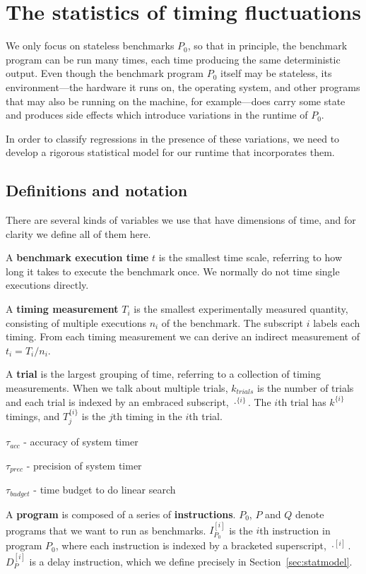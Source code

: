 \documentclass[conference]{IEEEtran}
\begin{document}
\section{The statistics of timing fluctuations}

We only focus on stateless benchmarks $P_0$, so that in principle, the benchmark program can be run many times, each time producing the same deterministic output. Even though the benchmark program $P_0$ itself may be stateless, its environment---the hardware it runs on, the operating system, and other programs that may also be running on the machine, for example---does carry some state and produces side effects which introduce variations in the runtime of $P_0$.

In order to classify regressions in the presence of these variations, we need to develop a rigorous statistical model for our runtime that incorporates them.

\subsection{Definitions and notation}

There are several kinds of variables we use that have dimensions of time, and for clarity we define all of them here.

A \textbf{benchmark execution time} $t$ is the smallest time scale, referring to how long it takes to execute the benchmark once. We normally do not time single executions directly.

A \textbf{timing measurement} $T_i$ is the smallest experimentally measured quantity, consisting of multiple executions $n_i$ of the benchmark. The subscript $i$ labels each timing. From each timing measurement we can derive an indirect measurement of $t_i = T_i/n_i$.

A \textbf{trial} is the largest grouping of time, referring to a collection of timing measurements. When we talk about multiple trials, $k_{trials}$ is the number of trials and each trial is indexed by an embraced subscript, $\cdot^{\{i\}}$. The $i$th trial has $k^{\{i\}}$ timings, and $T^{\{i\}}_j$ is the $j$th timing in the $i$th trial.

$\tau_{acc}$ - accuracy of system timer

$\tau_{prec}$ - precision of system timer

$\tau_{budget}$ - time budget to do linear search

A \textbf{program} is composed of a series of \textbf{instructions}. $P_0$, $P$ and $Q$ denote programs that we want to run as benchmarks. $I^{[i]}_{P_0}$ is the $i$th instruction in program $P_0$, where each instruction is indexed by a bracketed superscript, $\cdot^{[i]}$. $D^{[i]}_{P}$ is a delay instruction, which we define precisely in Section~\ref{sec:statmodel}.
\end{document}
